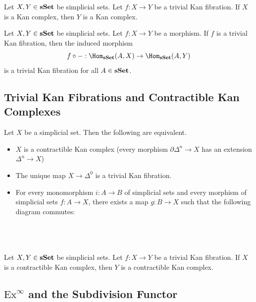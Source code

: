 \documentclass[a4paper]{article}
\begin{document}
\begin{prp}{}{} Let $X,Y\in\bold{sSet}$ be simplicial sets. Let $f:X\to Y$ be a trivial Kan fibration. If $X$ is a Kan complex, then $Y$ is a Kan complex. 
\end{prp}

\begin{prp}{}{} Let $X,Y\in\bold{sSet}$ be simplicial sets. Let $f:X\to Y$ be a morphism. If $f$ is a trivial Kan fibration, then the induced morphism $$f\circ -:\Hom_\bold{sSet}(A,X)\to\Hom_\bold{sSet}(A,Y)$$ is a trivial Kan fibration for all $A\in\bold{sSet}$. 
\end{prp}

\subsection{Trivial Kan Fibrations and Contractible Kan Complexes}
\begin{prp}{}{} Let $X$ be a simplicial set. Then the following are equivalent. 
\begin{itemize}
\item $X$ is a contractible Kan complex (every morphism $\partial\Delta^n\to X$ has an extension $\Delta^n\to X$)
\item The unique map $X\to\Delta^0$ is a trivial Kan fibration. 
\item For every monomorphism $i:A\to B$ of simplicial sets and every morphism of simplicial sets $f:A\to X$, there exists a map $g:B\to X$ such that the following diagram commutes: \\~\\
\\~\\
\end{itemize}
\end{prp}

\begin{prp}{}{} Let $X,Y\in\bold{sSet}$ be simplicial sets. Let $f:X\to Y$ be a trivial Kan fibration. If $X$ is a contractible Kan complex, then $Y$ is a contractible Kan complex. 
\end{prp}

\subsection{$\text{Ex}^\infty$ and the Subdivision Functor}
\end{document}
